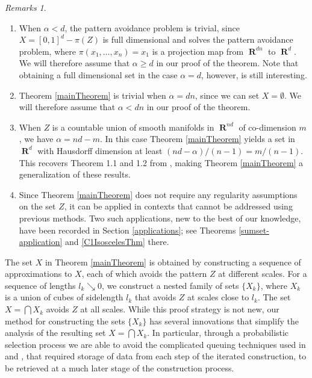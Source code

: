 \documentclass[dvipsnames,letterpaper,12pt]{article}
\numberwithin{equation}{section}
\theoremstyle{plain}
\theoremstyle{remark}
\newtheorem*{remarks}{Remarks}
\DeclareMathOperator{\RR}{\mathbf{R}}
\begin{document}
\begin{remarks}
	\
	\begin{enumerate}[1.]
		\item When $\alpha < d$, the pattern avoidance problem is trivial, since $X = [0,1]^d - \pi(Z)$ is full dimensional and solves the pattern avoidance problem, where $\pi(x_1, \dots, x_n) = x_1$ is a projection map from $\RR^{dn}$ to $\RR^d$. We will therefore assume that $\alpha \geq d$ in our proof of the theorem. Note that obtaining a full dimensional set in the case $\alpha = d$, however, is still interesting.

		\item Theorem \ref{mainTheorem} is trivial when $\alpha = dn$, since we can set $X = \emptyset$. We will therefore assume that $\alpha < dn$ in our proof of the theorem.

		\item When $Z$ is a countable union of smooth manifolds in $\RR^{nd}$ of co-dimension $m$, we have $\alpha = nd - m$. In this case Theorem \ref{mainTheorem} yields a set in $\RR^d$ with Hausdorff dimension at least $(nd - \alpha)/(n-1) = m/(n-1)$. This recovers Theorem 1.1 and 1.2 from \cite{MalabikaRob}, making Theorem \ref{mainTheorem} a generalization of these results.

		\item Since Theorem \ref{mainTheorem} does not require any regularity assumptions on the set $Z$, it can be applied in contexts that cannot be addressed using previous methods. Two such applications, new to the best of our knowledge, have been recorded in Section \ref{applications}; see Theorems \ref{sumset-application} and \ref{C1IsoscelesThm} there.
	\end{enumerate}
\end{remarks}

The set $X$ in Theorem \ref{mainTheorem} is obtained by constructing a sequence of approximations to $X$, each of which avoids the pattern $Z$ at different scales. For a sequence of lengths $l_k \searrow 0$, we construct a nested family of sets $\{ X_k \}$, where $X_k$ is a union of cubes of sidelength $l_k$ that avoids $Z$ at scales close to $l_k$. The set $X=\bigcap X_k$ avoids $Z$ at all scales. While this proof strategy is not new, our method for constructing the sets $\{ X_k \}$ has several innovations that simplify the analysis of the resulting set $X = \bigcap X_k$. In particular, through a probabilistic selection process we are able to avoid the complicated queuing techniques used in \cite{KeletiDimOneSet} and \cite{MalabikaRob}, that required storage of data from each step of the iterated construction, to be retrieved at a much later stage of the construction process.
\end{document}
